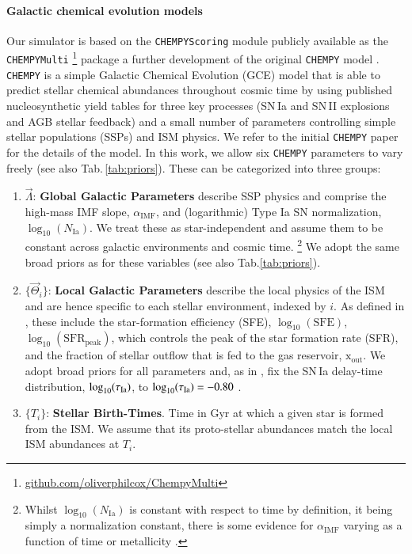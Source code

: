\documentclass{aa}
\begin{document}
\paragraph{Galactic chemical evolution models}
Our simulator is based on the \texttt{CHEMPYScoring} module \citep{Philcox_2018} publicly available as the \texttt{CHEMPYMulti} \citep{Philcox_2019}\footnote{\href{https://github.com/oliverphilcox/ChempyMulti}{github.com/oliverphilcox/ChempyMulti}} package a further development of the original \texttt{CHEMPY} model \citep{Rybizki_2017}. \texttt{CHEMPY} is a simple Galactic Chemical Evolution (GCE) model that is able to predict stellar chemical abundances throughout cosmic time by using published nucleosynthetic yield tables for three key processes (SN\,Ia and SN\,II explosions and AGB stellar feedback) and a small number of parameters controlling simple stellar populations (SSPs) and ISM physics. We refer to the initial \texttt{CHEMPY} paper \citep{Rybizki_2017} for the details of the model.
%
In this work, we allow six \texttt{CHEMPY} parameters to vary freely (see also Tab.\,\ref{tab:priors}). These can be categorized into three groups:
\vspace{-1em}
\begin{enumerate}
    \item $\vec\Lambda$: \textbf{Global Galactic Parameters} describe SSP physics and comprise the high-mass \citet{2003PASP..115..763C} IMF slope, $\alpha_\mathrm{IMF}$, and (logarithmic) Type Ia SN normalization, $\log_{10}(N_\mathrm{Ia})$. We treat these as star-independent and assume them to be constant across galactic environments and cosmic time. \footnote{Whilst $\log_{10}(N_\mathrm{Ia})$ is constant with respect to time by definition, it being simply a normalization constant, there is some evidence for $\alpha_\mathrm{IMF}$ varying as a function of time or metallicity \citep{2014ApJ...796...75C,2016MNRAS.462.2832C,2019MNRAS.482..118G,2019A&A...626A.124M}.} We adopt the same broad priors as \citep{Philcox_2019} for these variables (see also Tab.\ref{tab:priors}).  
    \item $\{\vec\Theta_i\}$: \textbf{Local Galactic Parameters} describe the local physics of the ISM and are hence specific to each stellar environment, indexed by $i$. As defined in \citep{Rybizki_2017}, these include the star-formation efficiency (SFE), $\log_{10}(\text{SFE})$, $\log_{10}(\mathrm{SFR}_\mathrm{peak})$, which controls the peak of the star formation rate (SFR), and the fraction of stellar outflow that is fed to the gas reservoir, $\mathrm{x}_\mathrm{out}$. We adopt broad priors for all parameters and, as in \citep{Philcox_2019}, fix the SN\,Ia delay-time distribution, $\log_{10}(\tau_{\rm Ia})$, to $\log_{10}(\tau_{\rm Ia})=-0.80$ \citep[see also][]{Philcox_2018}.
    \item $\{T_i\}$: \textbf{Stellar Birth-Times}. Time in Gyr at which a given star is formed from the ISM. We assume that its proto-stellar abundances match the local ISM abundances at $T_i$.
\end{enumerate}
\end{document}
